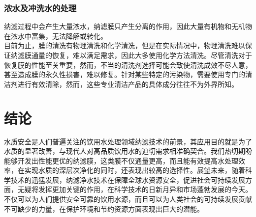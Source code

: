 \documentclass[a4paper,onecolumn,twoside]{article}
\begin{document}
    \subsubsection{浓水及冲洗水的处理}
  纳滤过程中会产生大量浓水，纳滤膜只产生分离的作用，因此大量有机物和无机物在浓水中富集，无法降解或转化。\\
  目前为止，膜的清洗有物理清洗和化学清洗，但是在实际情况中，物理清洗难以保证纳滤膜通量的恢复，难以满足需求，因此大多使用化学方法清洗。尽管清洗对于恢复膜的性能至关重要，然而，不当的清洗剂选择可能会致使清洗成效不尽人意，甚至造成膜的永久性损害，难以修复\cite{ZhaoMoFenChiJiShuZaiZaiShengShuiZhongDeYingYongJiMoWuRanYanJiuJinZhan2021}。针对某些特定的污染物，需要使用专门的清洁剂进行有效清除，然而，这些专业清洁产品的具体成分往往不为外界所知。
    
  \section{结论}
  水质安全是人们普遍关注的饮用水处理领域纳滤技术的前景，其应用目的就是为了水质的显著改善，与现代人对高品质饮用水的迫切需求相准确契合。我们热切期盼能够开发出性能更优的纳滤膜，这类膜不仅通量更高，而且能有效提高水处理效率，在实现水质的深层次净化的同时，还表现出较高的选择性。展望未来，随着科学技术的迅猛发展，纳滤净水技术在保障全球水资源安全，促进社会可持续发展方面，无疑将发挥更加关键的作用，在科学技术的日新月异和市场蓬勃发展的今天。不仅可以为人们提供安全可靠的饮用水源，而且可以为人类社会的可持续发展贡献不可缺少的力量，在保护环境和节约资源方面表现出巨大的潜能。
  
  \renewcommand\refname{参考文献}
  
  \xiaowuhao{
   
  \setlength{\itemsep}{- 2mm}
}


\end{document}
